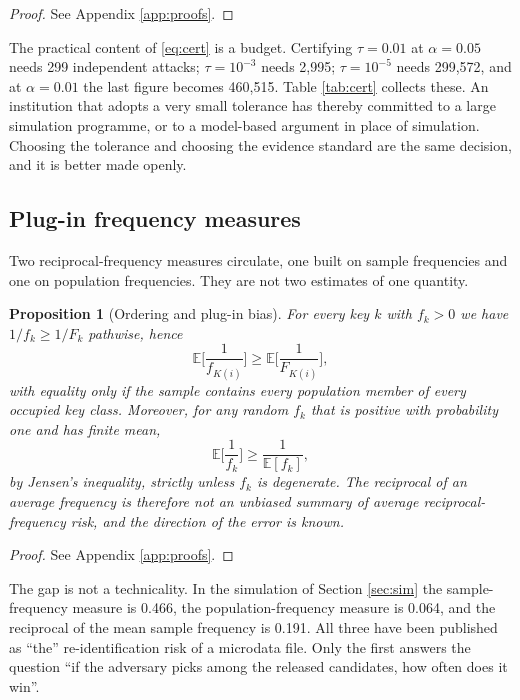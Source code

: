 \documentclass[11pt,a4paper]{article}
\theoremstyle{plain}
\newtheorem{proposition}{Proposition}
\theoremstyle{definition}
\theoremstyle{definition}
\theoremstyle{plain}
\newcommand{\E}{\mathbb{E}}
\begin{document}
\begin{proof}
See Appendix \ref{app:proofs}.
\end{proof}

The practical content of \eqref{eq:cert} is a budget. Certifying $\tau = 0.01$
at $\alpha = 0.05$ needs 299 independent attacks; $\tau = 10^{-3}$ needs 2,995;
$\tau = 10^{-5}$ needs 299,572, and at $\alpha = 0.01$ the last figure becomes
460,515. Table \ref{tab:cert} collects these. An institution that adopts a very
small tolerance has thereby committed to a large simulation programme, or to a
model-based argument in place of simulation. Choosing the tolerance and choosing
the evidence standard are the same decision, and it is better made openly.

\subsection{Plug-in frequency measures}

Two reciprocal-frequency measures circulate, one built on sample frequencies
and one on population frequencies. They are not two estimates of one quantity.

\begin{proposition}[Ordering and plug-in bias]\label{prop:plugin}
For every key $k$ with $f_k > 0$ we have $1/f_k \geq 1/F_k$ pathwise, hence
\begin{equation}
\E\Big[\frac{1}{f_{K(i)}}\Big] \geq \E\Big[\frac{1}{F_{K(i)}}\Big] ,
\end{equation}
with equality only if the sample contains every population member of every
occupied key class. Moreover, for any random $f_k$ that is positive with probability one and has
finite mean,
\begin{equation}
\E\Big[\frac{1}{f_k}\Big] \geq \frac{1}{\E[f_k]} ,
\end{equation}
by Jensen's inequality, strictly unless $f_k$ is degenerate. The reciprocal of
an average frequency is therefore not an unbiased summary of average
reciprocal-frequency risk, and the direction of the error is known.
\end{proposition}

\begin{proof}
See Appendix \ref{app:proofs}.
\end{proof}

The gap is not a technicality. In the simulation of Section \ref{sec:sim} the
sample-frequency measure is 0.466, the population-frequency measure is 0.064,
and the reciprocal of the mean sample frequency is 0.191. All three have been
published as ``the'' re-identification risk of a microdata file. Only the first
answers the question ``if the adversary picks among the released candidates,
how often does it win''.
\end{document}
